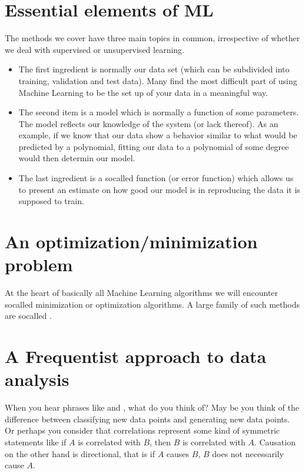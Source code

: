 \documentclass[letterpaper,10pt,english]{sphinxmanual}
\begin{document}
\chapter{Essential elements of ML}
\label{\detokenize{chapter1:essential-elements-of-ml}}
The methods we cover have three main topics in common, irrespective of
whether we deal with supervised or unsupervised learning.
\begin{itemize}
\item {} 
The first ingredient is normally our data set (which can be subdivided into training, validation  and test data). Many find the most difficult part of using Machine Learning to be the set up of your data in a meaningful way.

\item {} 
The second item is a model which is normally a function of some parameters.  The model reflects our knowledge of the system (or lack thereof). As an example, if we know that our data show a behavior similar to what would be predicted by a polynomial, fitting our data to a polynomial of some degree would then determin our model.

\item {} 
The last ingredient is a so\sphinxhyphen{}called  function (or error function) which allows us to present an estimate on how good our model is in reproducing the data it is supposed to train.

\end{itemize}


\chapter{An optimization/minimization problem}
\label{\detokenize{chapter1:an-optimization-minimization-problem}}
At the heart of basically all Machine Learning algorithms we will encounter so\sphinxhyphen{}called minimization or optimization algorithms. A large family of such methods are so\sphinxhyphen{}called .


\chapter{A Frequentist approach to data analysis}
\label{\detokenize{chapter1:a-frequentist-approach-to-data-analysis}}
When you hear phrases like  and
, what do you think of?  May be you think
of the difference between classifying new data points and generating
new data points.
Or perhaps you consider that correlations represent some kind of symmetric statements like
if \(A\) is correlated with \(B\), then \(B\) is correlated with
\(A\). Causation on the other hand is directional, that is if \(A\) causes \(B\), \(B\) does not
necessarily cause \(A\).
\end{document}
